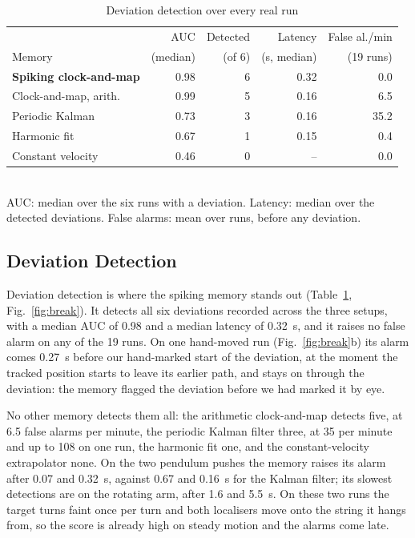 \documentclass[conference]{IEEEtran}
\begin{document}
\begin{table}[t]
\caption{Deviation detection over every real run}
\label{tab:deviation}
\centering
\footnotesize
\setlength{\tabcolsep}{3pt}
\begin{tabular}{lrrrr}
\toprule
 & AUC & Detected & Latency & False al./min \\
Memory & (median) & (of 6) & (s, median) & (19 runs) \\
\midrule
\textbf{Spiking clock-and-map} & 0.98 & 6 & 0.32 & 0.0 \\
Clock-and-map, arith. & 0.99 & 5 & 0.16 & 6.5 \\
Periodic Kalman & 0.73 & 3 & 0.16 & 35.2 \\
Harmonic fit & 0.67 & 1 & 0.15 & 0.4 \\
Constant velocity & 0.46 & 0 & -- & 0.0 \\
\bottomrule
\end{tabular}
\\[2pt]
{\scriptsize AUC: median over the six runs with a deviation. Latency: median over the detected deviations. False alarms: mean over runs, before any deviation.}
\end{table}

\subsection{Deviation Detection}
\label{sec:res-deviation}
Deviation detection is where the spiking memory stands out (Table~\ref{tab:deviation}, Fig.~\ref{fig:break}). It detects all six deviations recorded across the three setups, with a median AUC of 0.98 and a median latency of 0.32~s, and it raises no false alarm on any of the 19 runs. On one hand-moved run (Fig.~\ref{fig:break}b) its alarm comes 0.27~s before our hand-marked start of the deviation, at the moment the tracked position starts to leave its earlier path, and stays on through the deviation: the memory flagged the deviation before we had marked it by eye.

No other memory detects them all: the arithmetic clock-and-map detects five, at 6.5 false alarms per minute, the periodic Kalman filter three, at 35 per minute and up to 108 on one run, the harmonic fit one, and the constant-velocity extrapolator none. On the two pendulum pushes the memory raises its alarm after 0.07 and 0.32~s, against 0.67 and 0.16~s for the Kalman filter; its slowest detections are on the rotating arm, after 1.6 and 5.5~s. On these two runs the target turns faint once per turn and both localisers move onto the string it hangs from, so the score is already high on steady motion and the alarms come late.
\end{document}
